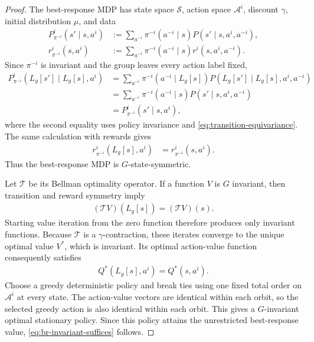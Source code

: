 \documentclass{article}
\theoremstyle{plain}
\theoremstyle{definition}
\theoremstyle{remark}
\newcommand{\St}{\mathcal{S}}
\newcommand{\Ac}{\mathcal{A}}
\begin{document}
\begin{proof}
The best-response MDP has state space $\St$, action space $\Ac^i$, discount
$\gamma$, initial distribution $\mu$, and data
\begin{align*}
  P^i_{\pi^{-i}}(s'\mid s,a^i)
  &:=
  \sum_{a^{-i}}
  \pi^{-i}(a^{-i}\mid s)
  P(s'\mid s,a^i,a^{-i}),\\
  r^i_{\pi^{-i}}(s,a^i)
  &:=
  \sum_{a^{-i}}
  \pi^{-i}(a^{-i}\mid s)
  r^i(s,a^i,a^{-i}).
\end{align*}
Since $\pi^{-i}$ is invariant and the group leaves every action label fixed,
\begin{align*}
  P^i_{\pi^{-i}}(L_g[s']\mid L_g[s],a^i)
  &=
  \sum_{a^{-i}}
  \pi^{-i}(a^{-i}\mid L_g[s])
  P(L_g[s']\mid L_g[s],a^i,a^{-i})\\
  &=
  \sum_{a^{-i}}
  \pi^{-i}(a^{-i}\mid s)
  P(s'\mid s,a^i,a^{-i})\\
  &=
  P^i_{\pi^{-i}}(s'\mid s,a^i),
\end{align*}
where the second equality uses policy invariance and
\eqref{eq:transition-equivariance}. The same calculation with rewards gives
\begin{align*}
  r^i_{\pi^{-i}}(L_g[s],a^i)
  &=
  r^i_{\pi^{-i}}(s,a^i).
\end{align*}
Thus the best-response MDP is $G$-state-symmetric.

Let $\mathcal T$ be its Bellman optimality operator. If a function $V$ is
$G$ invariant, then transition and reward symmetry imply
\begin{align*}
  (\mathcal T V)(L_g[s])
  =
  (\mathcal T V)(s).
\end{align*}
Starting value iteration from the zero function therefore produces only invariant
functions. Because $\mathcal T$ is a $\gamma$-contraction, these iterates converge
to the unique optimal value $V^*$, which is invariant. Its optimal action-value
function consequently satisfies
\begin{align*}
  Q^*(L_g[s],a^i)
  =
  Q^*(s,a^i).
\end{align*}
Choose a greedy deterministic policy and break ties using one fixed total order on
$\Ac^i$ at every state. The action-value vectors are identical within each orbit,
so the selected greedy action is also identical within each orbit. This gives a
$G$-invariant optimal stationary policy. Since this policy attains the unrestricted
best-response value, \eqref{eq:br-invariant-suffices} follows.
\end{proof}
\end{document}
